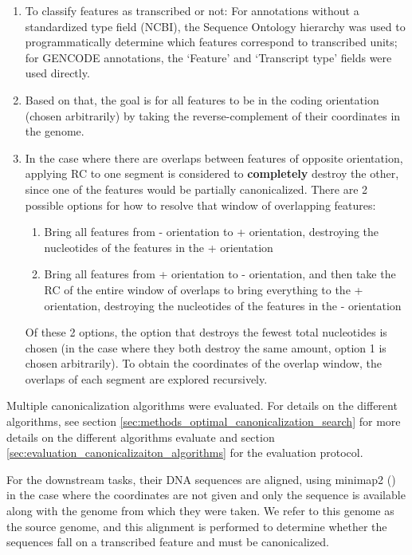 \documentclass[   ]{article}
\providecommand{\tightlist}{%
  \setlength{\itemsep}{0pt}\setlength{\parskip}{0pt}}
\begin{document}
\begin{enumerate}
\def\labelenumi{\arabic{enumi}.}
\setcounter{enumi}{1}
\item
  To classify features as transcribed or not: For annotations without a
  standardized type field (NCBI), the Sequence Ontology hierarchy
  \citep{eilbeckSequenceOntologyTool2005} was used to programmatically
  determine which features correspond to transcribed units; for GENCODE
  annotations, the `Feature' and `Transcript type' fields were used
  directly.
\item
  Based on that, the goal is for all features to be in the coding
  orientation (chosen arbitrarily) by taking the reverse-complement of
  their coordinates in the genome.
\item
  In the case where there are overlaps between features of opposite
  orientation, applying RC to one segment is considered to
  \textbf{completely} destroy the other, since one of the features would
  be partially canonicalized. There are 2 possible options for how to
  resolve that window of overlapping features:

  \begin{enumerate}[label=\alph*.]
  	\tightlist
  	\item
  	Bring all features from - orientation to + orientation, destroying
  	the nucleotides of the features in the + orientation
  	\item
  	Bring all features from + orientation to - orientation, and then
  	take the RC of the entire window of overlaps to bring everything to
  	the + orientation, destroying the nucleotides of the features in the
  	- orientation
  \end{enumerate}

  Of these 2 options, the option that destroys the fewest total
  nucleotides is chosen (in the case where they both destroy the same amount,
  option 1 is chosen arbitrarily). To obtain the coordinates of the
  overlap window, the overlaps of each segment are explored recursively.
\end{enumerate}

Multiple canonicalization algorithms were evaluated. For details on the different algorithms, see section \ref{sec:methods_optimal_canonicalization_search} for more details on the different algorithms evaluate and section \ref{sec:evaluation_canonicalizaiton_algorithms} for the evaluation protocol.

For the downstream tasks, their DNA sequences are aligned, using
minimap2 (\citep{liMinimap2PairwiseAlignment2018}) in the case where the
coordinates are not given and only the sequence is available along with
the genome from which they were taken. We refer to this genome as the
source genome, and this alignment is performed to determine whether the
sequences fall on a transcribed feature and must be canonicalized.
\end{document}
